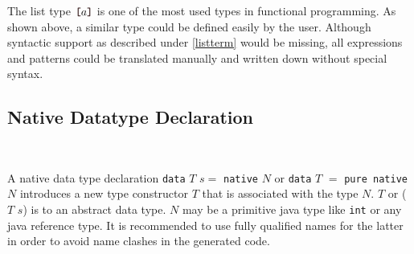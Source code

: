 \label{listtype} 
The list type $\bracka{}a\brackz{}$ is one of the most used types in functional programming. As shown above, a similar type could be defined easily by the user. Although syntactic support as described under \autoref{listterm} would be missing, all expressions and patterns could be translated manually and written down without special syntax.


\subsection{Native Datatype Declaration}    \label{nativedat}

\begin{flushleft}
    \sym{=}  
	\alt {}  \sym{=}   \\
  \oder{} 
 
  \alt {}
  \alt {}  
  \alt {}  
\end{flushleft}

A native data type declaration \texttt{data} $T$ $s =$ \texttt{native} $N$ or \texttt{data} $T$ $=$ \texttt{pure native} $N$ introduces a new type constructor $T$ that is associated with the \java{} type $N$. $T$ or ($T$ $s$) is to \frege{} an abstract data type. $N$ may be a primitive java type like \texttt{int} or any java reference type. It is recommended to use fully qualified \java{} names for the latter in order to avoid name clashes in the generated code.


